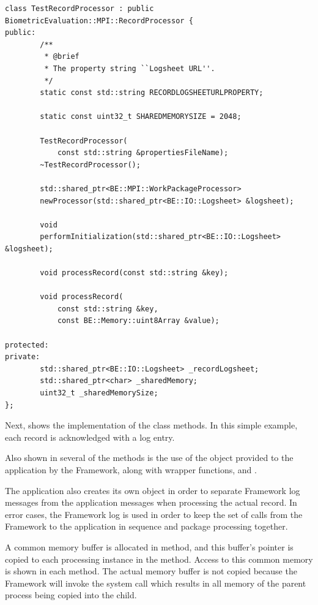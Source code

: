 \begin{lstlisting}[caption={MPI Framework Application Classes}, label=lst:mpiappclasses]
class TestRecordProcessor : public BiometricEvaluation::MPI::RecordProcessor {
public:
        /**
         * @brief
         * The property string ``Logsheet URL''.
         */
        static const std::string RECORDLOGSHEETURLPROPERTY;

        static const uint32_t SHAREDMEMORYSIZE = 2048;

        TestRecordProcessor(
            const std::string &propertiesFileName);
        ~TestRecordProcessor();

        std::shared_ptr<BE::MPI::WorkPackageProcessor>
        newProcessor(std::shared_ptr<BE::IO::Logsheet> &logsheet);

        void
        performInitialization(std::shared_ptr<BE::IO::Logsheet> &logsheet);

        void processRecord(const std::string &key);

        void processRecord(
            const std::string &key,
            const BE::Memory::uint8Array &value);

protected:
private:
        std::shared_ptr<BE::IO::Logsheet> _recordLogsheet;
        std::shared_ptr<char> _sharedMemory;
        uint32_t _sharedMemorySize;
};

\end{lstlisting}

Next,  shows the implementation of the class methods. In
this simple example, each record is acknowledged with a log entry.

Also shown in several of the methods is the use of the  object
provided to the application by the Framework, along with wrapper functions,
 and .

The application also creates its own
 object in order to separate Framework log messages from the
application messages when processing the actual record. In error cases, the
Framework log is used in order to keep the set of calls from the Framework
to the application in sequence and package processing together.

A common memory buffer is allocated in  method,
and this buffer's pointer is copied to each processing instance in the
 method. Access to this common memory is shown in each
 method. The actual memory buffer is not copied because
the Framework will invoke the system call  which results in all
memory of the parent process being copied into the child. 

